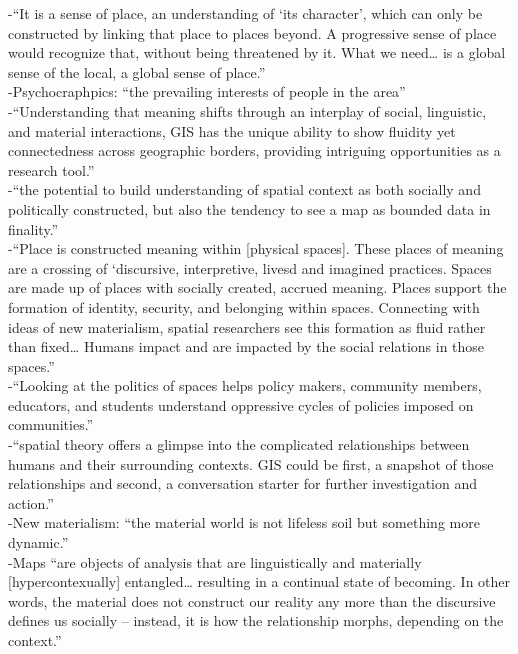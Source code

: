 -{\color{orange}“It is a sense of place, an understanding of ‘its character’, which can only be constructed by linking that place to places beyond. A progressive sense of place would recognize that, without being threatened by it. What we need… is a global sense of the local, a global sense of place.”}\cite{MasseyD1991}\\
-{\color{orange}Psychocraphpics: ``the prevailing interests of people in the area''}\cite{Chiappinelli2020}\\
-{\color{orange}“Understanding that meaning shifts through an interplay of social, linguistic, and material interactions, GIS has the unique ability to show fluidity yet connectedness across geographic borders, providing intriguing opportunities as a research tool.”\cite{McQueenBaker2019}}\\
-{\color{orange}“the potential to build understanding of spatial context as both socially and politically constructed, but also the tendency to see a map as bounded data in finality.”\cite{McQueenBaker2019}}\\
-{\color{orange}“Place is constructed meaning within [physical spaces]. These places of meaning are a crossing of ‘discursive, interpretive, livesd and imagined practices. Spaces are made up of places with socially created, accrued meaning. Places support the formation of identity, security, and belonging within spaces. Connecting with ideas of new materialism, spatial researchers see this formation as fluid rather than fixed… Humans impact and are impacted by the social relations in those spaces.”\cite{McQueenBaker2019}}\\
-{\color{orange}“Looking at the politics of spaces helps policy makers, community members, educators, and students understand oppressive cycles of policies imposed on communities.”\cite{McQueenBaker2019}}\\
-{\color{orange}“spatial theory offers a glimpse into the complicated relationships between humans and their surrounding contexts. GIS could be first, a snapshot of those relationships and second, a conversation starter for further investigation and action.”\cite{McQueenBaker2019}}\\
-{\color{orange}New materialism: “the material world is not lifeless soil but something more dynamic.”\cite{McQueenBaker2019}}\\
-{\color{orange}Maps “are objects of analysis that are linguistically and materially [hypercontexually] entangled… resulting in a continual state of becoming. In other words, the material does not construct our reality any more than the discursive defines us socially -- instead, it is how the relationship morphs, depending on the context.”\cite{McQueenBaker2019}}\\
